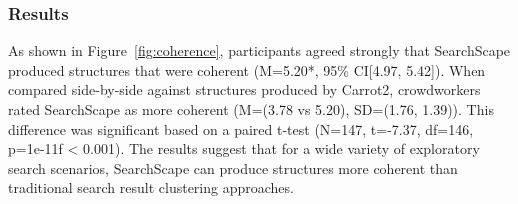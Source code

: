         




\subsubsection{Results}


As shown in Figure~\ref{fig:coherence},
participants agreed strongly that SearchScape produced structures that were coherent (M=5.20*, 95\% CI[4.97, 5.42]).
When compared side-by-side against structures produced by Carrot2, crowdworkers rated SearchScape as more coherent (M=(3.78 vs 5.20), SD=(1.76, 1.39)). This difference was significant based on a paired t-test (N=147, t=-7.37, df=146, p=1e-11f < 0.001). The results suggest that for a wide variety of exploratory search scenarios, SearchScape can produce structures more coherent than traditional search result clustering approaches. %



